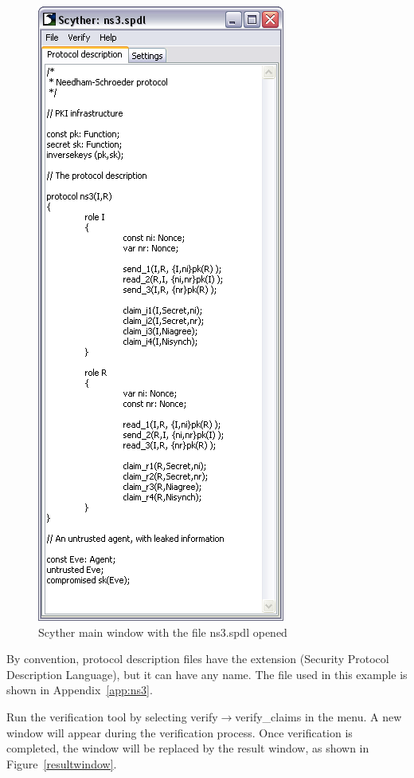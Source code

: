 \documentclass{book}
\begin{document}
\begin{figure}[!htb]
  \begin{center}
    \includegraphics[height=0.90\textheight]{protocolwindow}
  \end{center}
  \label{protocolwindow}
  \caption{Scyther main window with the file ns3.spdl opened}
\end{figure}

By
convention, protocol description files have the extension  (Security Protocol Description
Language), but it can have any name. The file used in this example is
shown in Appendix~\ref{app:ns3}.

Run the verification tool by selecting verify$\rightarrow$verify\_claims in the
menu. A new window will appear during the verification process. Once
verification is completed, the window will be
replaced by the result window, as shown in
Figure~\ref{resultwindow}.
\end{document}
